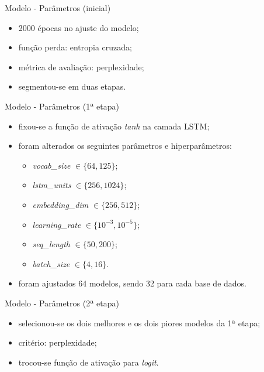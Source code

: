 \documentclass[xcolor=table]{beamer}
\begin{document}
    \begin{frame}{Modelo - Parâmetros (inicial)}
        \begin{itemize}
            \justifying
            \item 2000 épocas no ajuste do modelo;
            \item função perda: entropia cruzada;
            \item métrica de avaliação: perplexidade;
            \item segmentou-se em duas etapas.
        \end{itemize}
    \end{frame}
    
    \begin{frame}{Modelo - Parâmetros (1ª etapa)}
        \begin{itemize}
            \justifying
            \item fixou-se a função de ativação \textit{tanh} na camada LSTM;
            \item foram alterados os seguintes parâmetros e hiperparâmetros:
            \begin{itemize}
                \item \textit{vocab\_size} $\in \{64,125\}$;
                \item \textit{lstm\_units} $\in \{256,1024\}$;
                \item \textit{embedding\_dim} $\in \{256,512\}$;
                \item \textit{learning\_rate} $\in \{10^{-3},10^{-5}\}$;
                \item \textit{seq\_length} $\in \{50,200\}$;
                \item \textit{batch\_size} $\in \{4,16\}$.
            \end{itemize}
            \item foram ajustados 64 modelos, sendo 32 para cada base de dados.
        \end{itemize}
    \end{frame}
    
    \begin{frame}{Modelo - Parâmetros (2ª etapa)}
        \begin{itemize}
            \justifying
            \item selecionou-se os dois melhores e os dois piores modelos da 1ª etapa;
            \item critério: perplexidade;
            \item trocou-se função de ativação para \textit{logit}.
        \end{itemize}
    \end{frame}
    
\end{document}
